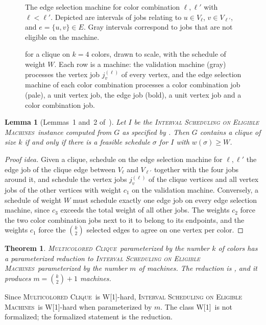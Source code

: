 \documentclass[11pt,a4paper]{article}
\newtheorem{theorem}{Theorem}
\newtheorem{lemma}{Lemma}
\theoremstyle{definition}
\newcommand{\ProbEM}{\textsc{Interval Scheduling on Eligible Machines}}
\newcommand{\MCC}{\textsc{Multicolored Clique}}
\newcommand{\Wone}{\textnormal{\textsf{W[1]}}}
\begin{document}
\begin{figure}[tb]
    \centering
    
    \caption{The edge selection machine for color combination $\ell,\ell'$ with
    $\ell<\ell'$. Depicted are intervals of jobs relating to $u\in V_\ell$, $v\in V_{\ell'}$,
    and $e=\{u,v\}\in E$. Gray intervals correspond to jobs that are not eligible on the
    machine.}
    \label{fig:w1_edge_selection}
\end{figure}

\begin{figure}[tb]
    \centering
    
    \caption{ for a clique on $k=4$ colors, drawn to scale, with the
    schedule of weight $W$. Each row is a machine: the validation machine (gray) processes
    the vertex job $j_v^{(\ell)}$ of every vertex, and the edge selection machine of each
    color combination processes a color combination job (pale), a unit vertex job, the edge
    job (bold), a unit vertex job and a color combination job.}
    \label{fig:w1_overview}
\end{figure}

\begin{lemma}[Lemmas~1 and~2 of~\cite{HIMS24}]\label{lem:corr1}
Let $I$ be the \ProbEM\ instance computed from $G$ as specified by .
Then $G$ contains a clique of size $k$ if and only if there is a feasible schedule
$\sigma$ for $I$ with $w(\sigma)\ge W$.
\end{lemma}
\begin{proof}[Proof idea]
Given a clique, schedule on the edge selection machine for $\ell,\ell'$ the edge job of the
clique edge between $V_\ell$ and $V_{\ell'}$ together with the four jobs around it, and
schedule the vertex jobs $j_v^{(\ell)}$ of the clique vertices and all vertex jobs of the
other vertices with weight $c_1$ on the validation machine. Conversely, a schedule of
weight $W$ must schedule exactly one edge job on every edge selection machine, since $c_3$
exceeds the total weight of all other jobs. The weights $c_2$ force the two color
combination jobs next to it to belong to its endpoints, and the weights $c_1$ force the
$\binom{k}{2}$ selected edges to agree on one vertex per color.
\end{proof}

\begin{theorem}\label{thm:w1hard}
\MCC\ parameterized by the number $k$ of colors has a parameterized reduction to \ProbEM\
parameterized by the number $m$ of machines. The reduction is , and it
produces $m=\binom{k}{2}+1$ machines.
\end{theorem}
Since \MCC\ is \Wone-hard, \ProbEM\ is \Wone-hard when parameterized by $m$. The class
\Wone\ is not formalized; the formalized statement is the reduction.
\end{document}
